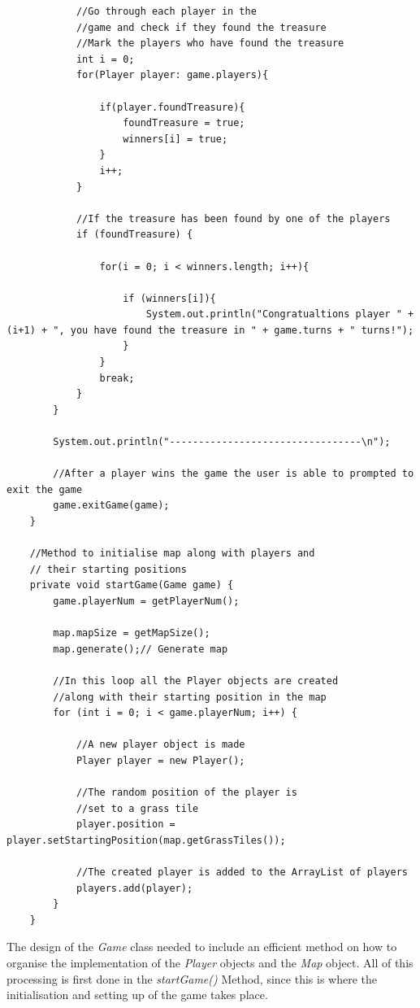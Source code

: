 \documentclass[a4paper,12pt]{extarticle}
\begin{document}
\begin{lstlisting}
            //Go through each player in the 
            //game and check if they found the treasure
            //Mark the players who have found the treasure
            int i = 0;
            for(Player player: game.players){

                if(player.foundTreasure){
                    foundTreasure = true;
                    winners[i] = true;
                }
                i++;
            }

            //If the treasure has been found by one of the players
            if (foundTreasure) {

                for(i = 0; i < winners.length; i++){

                    if (winners[i]){
                        System.out.println("Congratualtions player " + (i+1) + ", you have found the treasure in " + game.turns + " turns!");
                    }
                }
                break;
            }
        }

        System.out.println("---------------------------------\n");

        //After a player wins the game the user is able to prompted to exit the game
        game.exitGame(game);
    }

    //Method to initialise map along with players and
    // their starting positions
    private void startGame(Game game) {
        game.playerNum = getPlayerNum();

        map.mapSize = getMapSize();
        map.generate();// Generate map

        //In this loop all the Player objects are created 
        //along with their starting position in the map
        for (int i = 0; i < game.playerNum; i++) {

            //A new player object is made
            Player player = new Player();

            //The random position of the player is 
            //set to a grass tile
            player.position = player.setStartingPosition(map.getGrassTiles());

            //The created player is added to the ArrayList of players
            players.add(player);
        }
    }

\end{lstlisting}
\vspace{4mm}

\noindent The design of the \textit{Game} class needed to include an efficient method on how to organise the implementation of the \textit{Player} objects and the \textit{Map} object. All of this processing is first done in the \textit{startGame()} Method, since this is where the initialisation and setting up of the game takes place.\\ 
\end{document}
